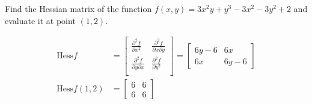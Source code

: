 Find the Hessian matrix of the function $f(x, y) = 3x^2y + y^3 - 3x^2 - 3y^2 + 2$ and evaluate it at point $(1, 2)$.

\begin{solution}
\begin{align*}
    \mathrm{Hess} f &= \begin{bmatrix}
        \frac{\partial^2 f}{\partial x^2} & \frac{\partial^2 f}{\partial x \partial y} \\
        \frac{\partial^2 f}{\partial y \partial x} & \frac{\partial^2 f}{\partial y^2} \\
    \end{bmatrix} = \begin{bmatrix}
        6y-6 & 6x \\
        6x & 6y - 6
    \end{bmatrix} \\
    \mathrm{Hess} f(1, 2) &= \begin{bmatrix}
        6 & 6 \\
        6 & 6
    \end{bmatrix}
\end{align*}
\end{solution}